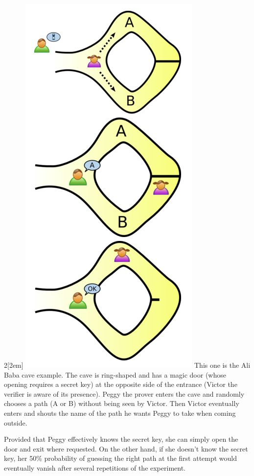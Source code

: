 \begin{multicols}{2}[\columnsep2em] 
\includegraphics[scale = 0.5]{Images/Ali_Baba.png}%
\label{fig:Ali Baba cave}
\columnbreak
This one is the Ali Baba cave example. The cave is ring-shaped and has a magic door (whose opening requires a secret key) at the opposite side of the entrance (Victor the verifier is aware of its presence). Peggy the prover enters the cave and randomly chooses a path (A or B) without being seen by Victor. Then Victor eventually enters and shouts the name of the path he wants Peggy to take when coming outside.
\end{multicols}
\noindent
Provided that Peggy effectively knows the secret key, she can simply open the door and exit where requested. On the other hand, if she doesn't know the secret key, her 50\% probability of guessing the right path at the first attempt would eventually vanish after several repetitions of the experiment. \\
